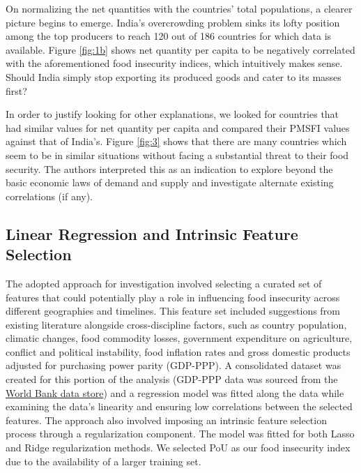 \documentclass{article}
\begin{document}
On normalizing the net quantities with the countries' total populations, a clearer picture begins to emerge. India's overcrowding problem \cite{overcrowding} sinks its lofty position among the top producers to reach 120 out of 186 countries for which data is available. Figure \ref{fig:1b} shows net quantity per capita to be negatively correlated with the aforementioned food insecurity indices, which intuitively makes sense. Should India simply stop exporting its produced goods and cater to its masses first?

In order to justify looking for other explanations, we looked for countries that had similar values for net quantity per capita and compared their PMSFI values against that of India's. Figure \ref{fig:3} shows that there are many countries which seem to be in similar situations without facing a substantial threat to their food security. The authors interpreted this as an indication to explore beyond the basic economic laws of demand and supply and investigate alternate existing correlations (if any).

\subsection{Linear Regression and Intrinsic Feature Selection}

The adopted approach for investigation involved selecting a curated set of features that could potentially play a role in influencing food insecurity across different geographies and timelines. This feature set included suggestions from existing literature alongside cross-discipline factors, such as country population, climatic changes, food commodity losses, government expenditure on agriculture, conflict and political instability, food inflation rates and gross domestic products adjusted for purchasing power parity (GDP-PPP). A consolidated dataset was created for this portion of the analysis (GDP-PPP data was sourced from the \href{https://data.worldbank.org/indicator/NY.GDP.PCAP.PP.CD}{World Bank data store}) and a regression model was fitted along the data while examining the data's linearity and ensuring low correlations between the selected features. The approach also involved imposing an intrinsic feature selection process through a regularization component. The model was fitted for both Lasso and Ridge regularization methods. We selected PoU as our food insecurity index due to the availability of a larger training set.
\end{document}
